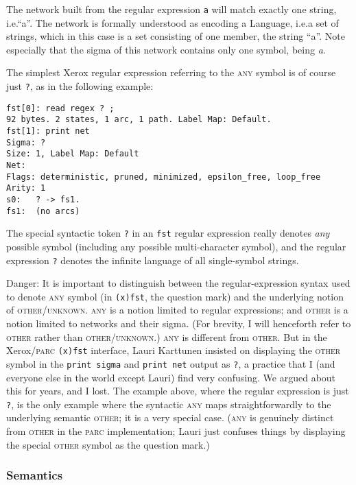 \documentclass[letterpaper,11pt]{article}
\providecommand{\acro}{}\renewcommand{\acro}{\textsc}
\begin{document}
\noindent
The network built from the regular expression \texttt{a} will match exactly one
string, i.e.\@ ``a''.  The network is formally understood as encoding a Language, i.e.\@ a
set of strings, which in this case is a set consisting of one member, the string
``a''.  Note especially that the sigma of this network contains only
one symbol, being \emph{a}.

The simplest Xerox regular expression referring to the \acro{any} symbol is of course just
\texttt{?}, as in the following example:

\begin{Verbatim}[fontsize=\footnotesize]
fst[0]: read regex ? ;
92 bytes. 2 states, 1 arc, 1 path. Label Map: Default.
fst[1]: print net
Sigma: ?
Size: 1, Label Map: Default
Net: 
Flags: deterministic, pruned, minimized, epsilon_free, loop_free
Arity: 1
s0:   ? -> fs1.
fs1:  (no arcs)
\end{Verbatim}

\noindent
The special syntactic token \texttt{?} in an \texttt{fst} regular expression
really denotes \emph{any} possible symbol
(including any possible multi-character symbol), and the regular expression \texttt{?}
denotes the infinite language of all single-symbol strings.

Danger:  It is important to distinguish between the
regular-expression syntax used to denote \acro{any}
symbol (in \texttt{(x)fst}, the question mark) and the underlying 
notion of \acro{other}/\acro{unknown}.  \acro{any} is a notion
limited to regular expressions; and \acro{other} is a notion limited
to networks and their sigma.
(For brevity, I will henceforth refer to \acro{other} rather than
\acro{other}/\acro{unknown}.)
\acro{any} is different from \acro{other}.  But in the
Xerox/\acro{parc} \texttt{(x)fst} interface, Lauri Karttunen
insisted on displaying the \acro{other} symbol in the \texttt{print sigma}
and \texttt{print net} output as \texttt{?}, a practice that I (and
everyone else in the world except Lauri) find very confusing.  We argued about this for
years, and I lost.  The example above, where the regular expression
is just \texttt{?}, is
the only example where the syntactic \acro{any} maps
straightforwardly to the underlying semantic
\acro{other}; it is a very special case.  (\acro{any} is genuinely
distinct from \acro{other} in the \acro{parc} implementation; Lauri
just confuses things by displaying the special \acro{other} symbol as the question
mark.)


\subsubsection{Semantics}
\end{document}
